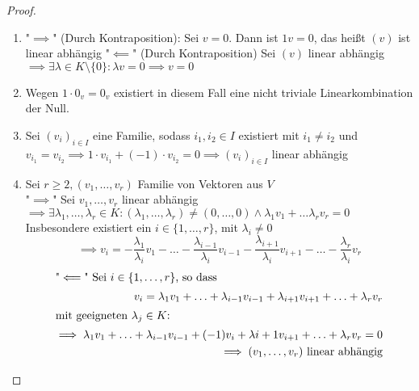 \documentclass[a4paper]{scrartcl}
\DeclareMathOperator{\Exists}{\exists}
\theoremstyle{definition}
\theoremstyle{plain}
\theoremstyle{plain}
\theoremstyle{remark}
\theoremstyle{remark}
\theoremstyle{remark}
\theoremstyle{remark}
\theoremstyle{remark}
\begin{document}
\begin{proof}
\begin{enumerate}
\item "$\implies$" (Durch Kontraposition): Sei $v = 0$. Dann ist $1 v = 0$, das heißt $(v)$ ist linear abhängig
"$\impliedby$" (Durch Kontraposition) Sei $(v)$ linear abhängig $\implies \Exists \lambda \in K \setminus \{0\}: \lambda v = 0 \implies v = 0$
\item Wegen $1 \cdot 0_v = 0_v$ existiert in diesem Fall eine nicht triviale Linearkombination der Null.
\item Sei $(v_i)_{i\in I}$ eine Familie, sodass $i_1, i_2 \in I$ existiert mit $i_1 \neq i_2$ und $v_{i_1} = v_{i_2} \implies 1 \cdot v_{i_1} + (-1) \cdot v_{i_2} = 0 \implies (v_i)_{i\in I}$ linear abhängig
\item Sei $r\geq 2, (v_1, \ldots, v_r)$ Familie von Vektoren aus $V$ \\
     "$\implies$" Sei $v_1, \ldots, v_r$ linear abhängig $\implies \Exists \lambda_1, \ldots, \lambda_r \in K: (\lambda_1, \ldots, \lambda_r) \neq (0, \ldots, 0) \wedge \lambda_1 v_1 + \ldots \lambda_r v_r = 0$
     Insbesondere existiert ein $i\in \{1, \ldots ,r\}$, mit $\lambda_i \neq 0$
     \[\implies v_i = -\frac{\lambda_1}{\lambda_i} v_1 - \ldots - \frac{\lambda_{i - 1}}{\lambda_i} v_{i - 1} - \frac{\lambda_{i + 1}}{\lambda_i} v_{i + 1} - \ldots - \frac{\lambda_{r}}{\lambda_i} v_{r}\]
\begin{align*}
\intertext{"$\impliedby$" Sei $i\in\{1,\ldots, r\}$, so dass}
v_i = \lambda_1 v_1 + \ldots + \lambda_{i - 1} v_{i - 1} + \lambda_{i + 1} v_{i + 1} + \ldots + \lambda_{r} v_{r} \\
\intertext{mit geeigneten $\lambda_j \in K$:}
\implies \lambda_1 v_1 + \ldots + \lambda_{i - 1} v_{i - 1} + (-1) v_i + \lambda{i + 1} v_{i + 1} + \ldots + \lambda_r v_r = 0 \\
\implies (v_1, \ldots, v_r) ~\text{linear abhängig} \\
\end{align*}
\end{enumerate}
\end{proof}
\end{document}

